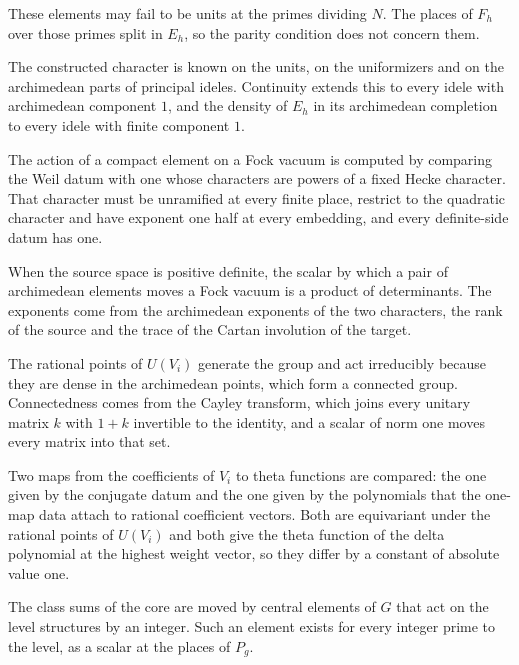 These elements may fail to be units at the primes dividing $N$. The places of $F_h$ over those primes split in $E_h$,
so the parity condition does not concern them.

The constructed character is known on the units, on the uniformizers and on the archimedean parts of principal
ideles. Continuity extends this to every idele with archimedean component $1$, and the density of $E_h$ in its
archimedean completion to every idele with finite component $1$.

The action of a compact element on a Fock vacuum is computed by comparing the Weil datum with one whose characters are
powers of a fixed Hecke character. That character must be unramified at every finite place, restrict to the quadratic
character and have exponent one half at every embedding, and every definite-side datum has one.

When the source space is positive definite, the scalar by which a pair of archimedean elements moves a Fock vacuum is a
product of determinants. The exponents come from the archimedean exponents of the two characters, the rank of the
source and the trace of the Cartan involution of the target.

The rational points of $U(V_i)$ generate the group and act irreducibly because they are dense in the archimedean
points, which form a connected group. Connectedness comes from the Cayley transform, which joins every unitary matrix
$k$ with $1+k$ invertible to the identity, and a scalar of norm one moves every matrix into that set.

Two maps from the coefficients of $V_i$ to theta functions are compared: the one given by the conjugate
datum and the one given by the polynomials that the one-map data attach to rational coefficient vectors.
Both are equivariant under the rational points of $U(V_i)$ and both give the theta function of the delta
polynomial at the highest weight vector, so they differ by a constant of absolute value one.

The class sums of the core are moved by central elements of $G$ that act on the level structures by an
integer. Such an element exists for every integer prime to the level, as a scalar at the places of $P_g$.

